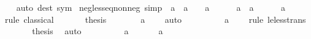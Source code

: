 \begin{isabellebody}
%
\isadelimproof
\ \ %
\endisadelimproof
%
\isatagproof
{}\isamarkupfalse%
\ {\isacharparenleft}{\kern0pt}auto\ dest{\isacharcolon}{\kern0pt}\ sym{\isacharparenright}{\kern0pt}%
\endisatagproof
{\isafoldproof}%
%
\isadelimproof
\isanewline
%
\endisadelimproof
\isanewline
{}\isamarkupfalse%
\ neg{\isacharunderscore}{\kern0pt}less{\isacharunderscore}{\kern0pt}eq{\isacharunderscore}{\kern0pt}nonneg\ {\isacharbrackleft}{\kern0pt}simp{\isacharbrackright}{\kern0pt}{\isacharcolon}{\kern0pt}\ {\isachardoublequoteopen}{\isacharminus}{\kern0pt}\ a\ {\isasymle}\ a\ {\isasymlongleftrightarrow}\ {}\ {\isasymle}\ a{\isachardoublequoteclose}\isanewline
%
\isadelimproof
%
\endisadelimproof
%
\isatagproof
{}\isamarkupfalse%
\isanewline
\ \ \isamarkupfalse%
\ {\isacharasterisk}{\kern0pt}{\isacharcolon}{\kern0pt}\ {\isachardoublequoteopen}{\isacharminus}{\kern0pt}\ a\ {\isasymle}\ a{\isachardoublequoteclose}\isanewline
\ \ \isamarkupfalse%
\ {\isachardoublequoteopen}{}\ {\isasymle}\ a{\isachardoublequoteclose}\isanewline
\ \ \isamarkupfalse%
\ {\isacharparenleft}{\kern0pt}rule\ classical{\isacharparenright}{\kern0pt}\isanewline
\ \ \ \ \isamarkupfalse%
\ {\isachardoublequoteopen}{\isasymnot}\ {\isacharquery}{\kern0pt}thesis{\isachardoublequoteclose}\isanewline
\ \ \ \ \isamarkupfalse%
\ \isamarkupfalse%
\ {\isachardoublequoteopen}a\ {\isacharless}{\kern0pt}\ {}{\isachardoublequoteclose}\ \isamarkupfalse%
\ auto\isanewline
\ \ \ \ \isamarkupfalse%
\ {\isacharasterisk}{\kern0pt}\ \isamarkupfalse%
\ {\isachardoublequoteopen}{\isacharminus}{\kern0pt}\ a\ {\isacharless}{\kern0pt}\ {}{\isachardoublequoteclose}\ \isamarkupfalse%
\ {\isacharparenleft}{\kern0pt}rule\ le{\isacharunderscore}{\kern0pt}less{\isacharunderscore}{\kern0pt}trans{\isacharparenright}{\kern0pt}\isanewline
\ \ \ \ \isamarkupfalse%
\ \isamarkupfalse%
\ {\isacharquery}{\kern0pt}thesis\ \isamarkupfalse%
\ auto\isanewline
\ \ \isamarkupfalse%
\isanewline
{}\isamarkupfalse%
\isanewline
\ \ \isamarkupfalse%
\ {\isacharasterisk}{\kern0pt}{\isacharcolon}{\kern0pt}\ {\isachardoublequoteopen}{}\ {\isasymle}\ a{\isachardoublequoteclose}\isanewline
\ \ \isamarkupfalse%
\ \isamarkupfalse%
\ {\isachardoublequoteopen}{\isacharminus}{\kern0pt}\ a\ {\isasymle}\ {}{\isachardoublequoteclose}\ \isamarkupfalse%

\end{isabellebody}
